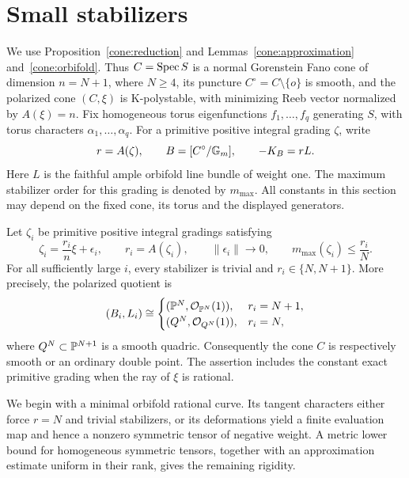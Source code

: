 \section{Small stabilizers}
\label{small:section}

We use Proposition~\ref{cone:reduction} and
Lemmas~\ref{cone:approximation} and~\ref{cone:orbifold}.  Thus
\(C=\operatorname{Spec} S\) is a normal Gorenstein Fano cone of dimension \(n=N+1\),
where \(N\geq4\), its puncture \(C^\circ=C\setminus\{o\}\) is smooth,
and the polarized cone \((C,\xi)\) is K-polystable, with minimizing
Reeb vector normalized by \(A(\xi)=n\).  Fix homogeneous torus eigenfunctions
\(f_1,\ldots,f_q\) generating \(S\), with torus characters
\(\alpha_1,\ldots,\alpha_q\).  For a primitive positive integral grading
\(\zeta\), write
\[
 r=A(\zeta),\qquad
 B=[C^\circ/\mathbb G_m],\qquad -K_B=rL.
\]
Here \(L\) is the faithful ample orbifold line bundle of weight one.
The maximum stabilizer order for this grading is denoted by
\(m_{\max}\).  All constants in this section may depend on the fixed cone,
its torus and the displayed generators.

\begin{theorem}
\label{small:classification}
Let \(\zeta_i\) be primitive positive integral gradings satisfying
\begin{equation}
 \zeta_i=\frac{r_i}{n}\xi+\epsilon_i,
 \qquad r_i=A(\zeta_i),\qquad \|\epsilon_i\|\longrightarrow0,
 \qquad m_{\max}(\zeta_i)\leq\frac{r_i}{N}.
 \label{small:fast-sequence}
\end{equation}
For all sufficiently large \(i\), every stabilizer is trivial and
\(r_i\in\{N,N+1\}\).  More precisely, the polarized quotient is
\[
 (B_i,L_i)\cong
 \begin{cases}
  (\mathbb P^N,\mathcal O_{\mathbb P^N}(1)),&r_i=N+1,\\
  (Q^N,\mathcal O_{Q^N}(1)),&r_i=N,
 \end{cases}
\]
where \(Q^N\subset\mathbb P^{N+1}\) is a smooth quadric.  Consequently the cone
\(C\) is respectively smooth or an ordinary double point.  The assertion
includes the constant exact primitive grading when the ray of \(\xi\)
is rational.
\end{theorem}

We begin with a minimal orbifold rational curve.  Its tangent characters
either force \(r=N\) and trivial stabilizers, or its deformations yield a
finite evaluation map and hence a nonzero symmetric tensor of negative
weight.  A metric lower bound for homogeneous symmetric tensors, together
with an approximation estimate uniform in their rank, gives the remaining
rigidity.

